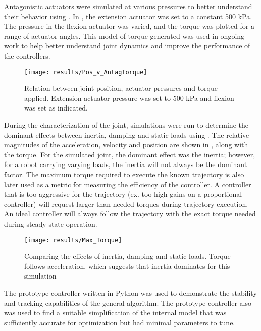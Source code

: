 
Antagonistic actuators were simulated at various pressures to better understand
their behavior using . In , the extension
actuator was set to a constant 500 kPa. The pressure in the flexion actuator was
varied, and the torque was plotted for a range of actuator angles. This model of
torque generated was used in ongoing work to help better understand joint
dynamics and improve the performance of the controllers.

\begin{figure}
\centering
\texttt{[image: results/Pos\_v\_AntagTorque]}
\caption{Relation between joint position, actuator pressures and
torque applied. Extension actuator pressure was set to 500 kPa and flexion was
set as indicated.}
\label{fig:AntagonisticPressureTorque}
\end{figure}

During the characterization of the joint, simulations were run to determine the
dominant effects between inertia, damping and static loads using . The relative 
magnitudes of the acceleration, velocity and position are shown in 
, along with the
torque. For the simulated joint, the dominant effect was the inertia; however,
for a robot carrying varying loads, the inertia will not always be the dominant factor. The 
maximum torque required to execute the known trajectory is also later used as a
metric for measuring the efficiency of the controller. A controller that is too
aggressive for the trajectory (ex. too high gains on a proportional controller)
will request larger than needed torques during trajectory execution. An ideal
controller will always follow the trajectory with the exact torque needed during steady state operation.

\begin{figure}
\centering
\texttt{[image: results/Max\_Torque]}
\caption{Comparing the effects of inertia, damping and static loads. Torque follows acceleration, which suggests that inertia dominates for this simulation}
\label{fig:MaxTorque}
\end{figure}


The prototype controller written in Python was used to demonstrate the stability
and tracking capabilities of the general algorithm. The prototype controller also was used to find a
suitable simplification of the internal model that was sufficiently accurate for
optimization but had minimal parameters to tune.

